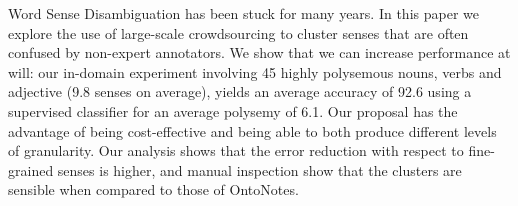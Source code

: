 Word Sense Disambiguation has been stuck for many years. In this paper we explore the use of large-scale crowdsourcing to cluster senses that are often confused by non-expert annotators. We show that we can increase performance at will: our in-domain experiment involving 45 highly polysemous nouns, verbs and adjective (9.8 senses on average), yields an average accuracy of 92.6 using a supervised classifier for an average polysemy of 6.1. Our proposal has the advantage of being cost-effective and being able to both produce different levels of granularity. Our analysis shows that the error reduction with respect to fine-grained senses is higher, and manual inspection show that the clusters are sensible when compared to those of OntoNotes.

